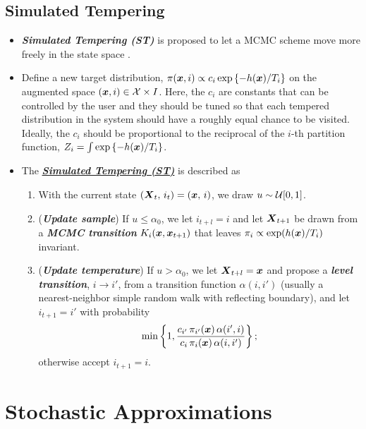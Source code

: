 \documentclass[11pt]{article}
\begin{document}
\subsection{Simulated Tempering}
\begin{itemize}
\item \emph{\textbf{Simulated Tempering (ST)}} is proposed to let a MCMC scheme move more freely in the state space \citep{liu2001monte}.

\item Define a new target distribution, $\pi(\boldsymbol{x}, i) \propto c_{i}\exp\left\{-h(\boldsymbol{x})/T_{i}\right\}$ on the augmented space $(\boldsymbol{x}, i) \in {\mathcal X} \times I$. Here, the $c_i$ are constants that can be controlled by the user and they should be tuned so that each tempered distribution in the system should have a roughly equal chance to be visited. Ideally, the $c_i$ should be proportional to the reciprocal of the $i$-th partition function, $Z_i = \int \exp\left\{-h(\boldsymbol{x})/T_i\right\}$.

\item The \underline{\emph{\textbf{Simulated Tempering (ST)}}} is described as 
\begin{enumerate}
\item With the current state $(\boldsymbol{X}_{t},\, i_{t}) = (\boldsymbol{x}, \,i)$, we draw $u\sim {\mathcal U}[0,1]$.
\item (\emph{\textbf{Update sample}}) If $u \le \alpha_0$, we let $i_{t+l} = i$ and let $\boldsymbol{X}_{t+1}$ be drawn from a \emph{\textbf{MCMC transition}} $K_i(\boldsymbol{x}, \boldsymbol{x}_{t+1})$ that leaves $\pi_i\propto \exp(h(\boldsymbol{x})/T_{i})$ invariant.

\item (\emph{\textbf{Update temperature}}) If $u > \alpha_0$, we let $\boldsymbol{X}_{t+l} = \boldsymbol{x}$ and propose a \emph{\textbf{level transition}}, $i \rightarrow i'$, from a transition function $\alpha(i, i')$ (usually a nearest-neighbor simple random walk with reflecting boundary), and let $i_{t+1} = i'$ with probability
\begin{align*}
\min\left\{1, \frac{c_{i'}\,\pi_{i'}(\boldsymbol{x})\,\alpha(i', i) }{ c_{i}\,\pi_i(\boldsymbol{x})\,\alpha(i, i')}\right\};
\end{align*} otherwise accept $i_{t+1} = i$.
\end{enumerate} 
\end{itemize}

\section{Stochastic Approximations}
\end{document}
